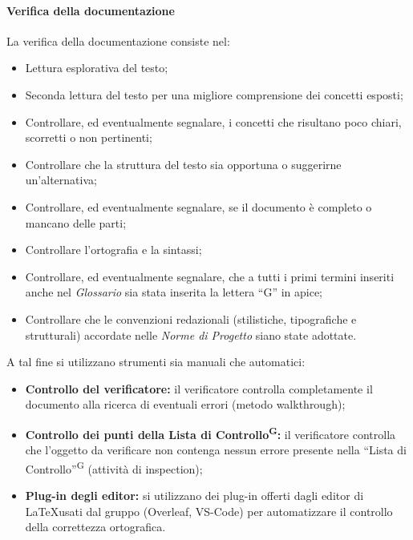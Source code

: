 \paragraph{Verifica della documentazione}
La verifica della documentazione consiste nel:
\begin{itemize}
    \item Lettura esplorativa del testo;
    \item Seconda lettura del testo per una migliore comprensione dei concetti esposti;
    \item Controllare, ed eventualmente segnalare, i concetti che risultano poco chiari, scorretti o non pertinenti;
    \item Controllare che la struttura del testo sia opportuna o suggerirne un'alternativa;
    \item Controllare, ed eventualmente segnalare, se il documento è completo o mancano delle parti;
    \item Controllare l'ortografia e la sintassi;
    \item Controllare, ed eventualmente segnalare, che a tutti i primi termini inseriti anche nel \textit{Glossario} sia stata inserita la lettera ``G'' in apice;
    \item Controllare che le convenzioni redazionali (stilistiche, tipografiche e strutturali) accordate nelle \textit{Norme di Progetto} siano state adottate.
\end{itemize}
A tal fine si utilizzano strumenti sia manuali che automatici:
\begin{itemize}
    \item \textbf{Controllo del verificatore:} il verificatore controlla completamente il documento alla ricerca di eventuali errori (metodo walkthrough);
    \item \textbf{Controllo dei punti della Lista di Controllo\textsuperscript{G}:} il verificatore controlla che l'oggetto da verificare non contenga nessun errore presente nella ``Lista di Controllo''\textsuperscript{G} (attività di inspection);
    \item \textbf{Plug-in degli editor:} si utilizzano dei plug-in offerti dagli editor di \LaTeX\space usati dal gruppo (Overleaf, VS-Code) per automatizzare il controllo della correttezza ortografica.
\end{itemize}

